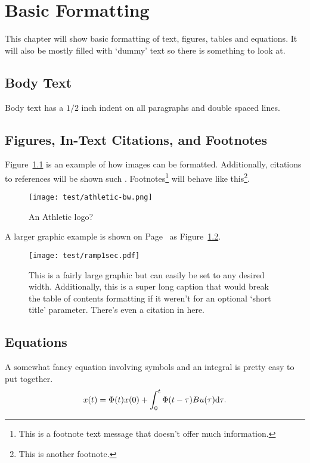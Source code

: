 \chapter{Basic Formatting}
This chapter will show basic formatting of text, figures, tables and equations. It will also be mostly filled with `dummy' text so there is something to look at.

\section{Body Text}
Body text has a $1/2$ inch indent on all paragraphs and double spaced lines.
\lipsum[6]
\section{Figures, In-Text Citations, and Footnotes}
Figure~\ref{fig:athletic logo} is an example of how images can be formatted. Additionally, citations to references will be shown such \cite{latexcompanion}. Footnotes\footnote{This is a footnote text message that doesn't offer much information.} will behave like this\footnote{This is another footnote.}.

\begin{figure}[!ht]
	\centering
	\footnotesize
	\texttt{[image: test/athletic-bw.png]}
	\caption{An Athletic logo?}
	\label{fig:athletic logo}
\end{figure}\vspace{-1em} %

A larger graphic example is shown on Page~\pageref{fig:ramp test 1} as Figure~\ref{fig:ramp test 1}. \lipsum[8] 

\begin{figure}[!ht]
	\centering
	\texttt{[image: test/ramp1sec.pdf]}
	\caption[60 Second Ramp Test.]{This is a fairly large graphic but can easily be set to any desired width. Additionally, this is a super long caption that would break the table of contents formatting if it weren't for an optional `short title' parameter. There's even a citation in here\cite{stajcar}.}
	\label{fig:ramp test 1}
\end{figure}%

\lipsum[15]

\section{Equations}
	A somewhat fancy equation involving symbols and an integral is pretty easy to put together. \lipsum[5] %
	\begin{equation}{\label{eq:ssSoln}}
		x(t) = \Phi(t) x(0) + \int_{0}^{t}\Phi(t-\tau)Bu(\tau) \text{d}\tau.
	\end{equation}

